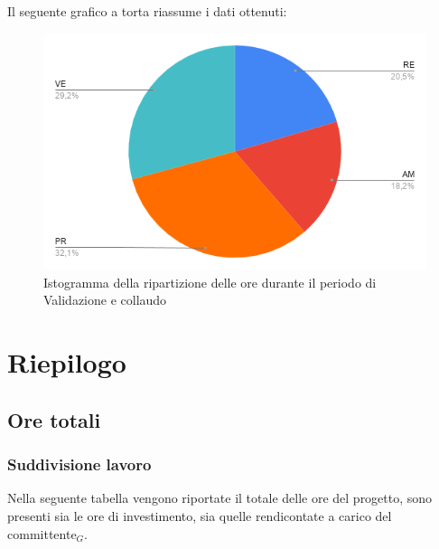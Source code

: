 {{{{{{{{{{Il seguente grafico a torta riassume i dati ottenuti:
\begin{figure}[!ht]
	\begin{center}
		\includegraphics[width=0.8\linewidth]{../immagini/pdp/torta_validazione.png}
		\caption{Istogramma della ripartizione delle ore durante il periodo di Validazione e
			collaudo}
	\end{center}
\end{figure}

\section{Riepilogo}\label{PreventivoRiepilogo}

\subsection{Ore totali}\label{PreventivoRiepilogoOreTotali}

\subsubsection{Suddivisione lavoro}\label{PreventivoRiepilogoOreTotaliSuddivisioneDelLavoro}
Nella seguente tabella vengono riportate il totale delle ore del progetto, sono presenti sia le ore di investimento, sia quelle rendicontate a carico del committente$_G$.
\quad
\def\tabularxcolumn#1{m{#1}}
{

}}}}}}}}}}}
